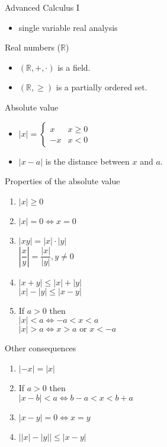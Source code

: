 \documentclass[twocolumn]{article}
\newcommand{\reals}{\mathbb{R}}
\begin{document}
Advanced Calculus I
\begin{itemize}
	\item
		single variable real analysis
\end{itemize}

Real numbers ($\reals$)
\begin{itemize}
	\item
		$(\reals, +, \cdot)$ is a field.
	\item
		$(\reals, \geq)$ is a partially ordered set.
\end{itemize}

Absolute value
\begin{itemize}
	\item
		$|x| = \begin{cases}
			x & x \geq 0 \\
			-x & x < 0 
		\end{cases}$
	\item
		$|x - a|$ is the distance between $x$ and $a$.
\end{itemize}

Properties of the absolute value
\begin{enumerate}
	\item
		$|x| \geq 0$
	\item
		$|x| = 0 \Leftrightarrow x = 0$
	\item
		$|xy| = |x| \cdot |y|$ \\
		$\left|\dfrac{x}{y}\right| = \dfrac{|x|}{|y|}, y \neq 0$
	\item
		$|x + y| \leq |x| + |y|$ \\
		$|x| - |y| \leq |x - y|$
	\item
		If $a > 0$ then \\
		$|x| < a \Leftrightarrow -a < x < a$ \\
		$|x| > a \Leftrightarrow x > a \text{ or } x < -a$
\end{enumerate}

Other consequences
\begin{enumerate}
	\item
		$|-x| = |x|$
	\item
		If $a > 0$ then \\
		$|x - b| < a \Leftrightarrow b - a < x < b + a$
	\item
		$|x - y| = 0 \Leftrightarrow x = y$
	\item
		$\bigl||x| - |y|\bigr| \leq |x - y|$
\end{enumerate}
\end{document}
